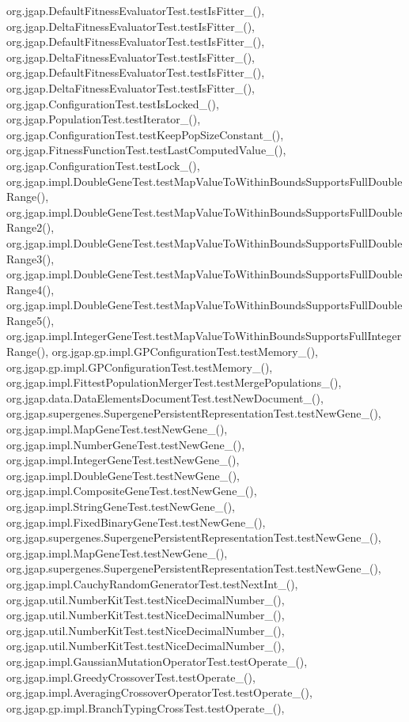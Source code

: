 org.\-jgap.\-Default\-Fitness\-Evaluator\-Test.\-test\-Is\-Fitter\-\_(), org.\-jgap.\-Delta\-Fitness\-Evaluator\-Test.\-test\-Is\-Fitter\-\_(), org.\-jgap.\-Default\-Fitness\-Evaluator\-Test.\-test\-Is\-Fitter\-\_(), org.\-jgap.\-Delta\-Fitness\-Evaluator\-Test.\-test\-Is\-Fitter\-\_(), org.\-jgap.\-Default\-Fitness\-Evaluator\-Test.\-test\-Is\-Fitter\-\_(), org.\-jgap.\-Delta\-Fitness\-Evaluator\-Test.\-test\-Is\-Fitter\-\_(), org.\-jgap.\-Configuration\-Test.\-test\-Is\-Locked\-\_(), org.\-jgap.\-Population\-Test.\-test\-Iterator\-\_(), org.\-jgap.\-Configuration\-Test.\-test\-Keep\-Pop\-Size\-Constant\-\_(), org.\-jgap.\-Fitness\-Function\-Test.\-test\-Last\-Computed\-Value\-\_(), org.\-jgap.\-Configuration\-Test.\-test\-Lock\-\_(), org.\-jgap.\-impl.\-Double\-Gene\-Test.\-test\-Map\-Value\-To\-Within\-Bounds\-Supports\-Full\-Double\-Range(), org.\-jgap.\-impl.\-Double\-Gene\-Test.\-test\-Map\-Value\-To\-Within\-Bounds\-Supports\-Full\-Double\-Range2(), org.\-jgap.\-impl.\-Double\-Gene\-Test.\-test\-Map\-Value\-To\-Within\-Bounds\-Supports\-Full\-Double\-Range3(), org.\-jgap.\-impl.\-Double\-Gene\-Test.\-test\-Map\-Value\-To\-Within\-Bounds\-Supports\-Full\-Double\-Range4(), org.\-jgap.\-impl.\-Double\-Gene\-Test.\-test\-Map\-Value\-To\-Within\-Bounds\-Supports\-Full\-Double\-Range5(), org.\-jgap.\-impl.\-Integer\-Gene\-Test.\-test\-Map\-Value\-To\-Within\-Bounds\-Supports\-Full\-Integer\-Range(), org.\-jgap.\-gp.\-impl.\-G\-P\-Configuration\-Test.\-test\-Memory\-\_(), org.\-jgap.\-gp.\-impl.\-G\-P\-Configuration\-Test.\-test\-Memory\-\_(), org.\-jgap.\-impl.\-Fittest\-Population\-Merger\-Test.\-test\-Merge\-Populations\-\_(), org.\-jgap.\-data.\-Data\-Elements\-Document\-Test.\-test\-New\-Document\-\_(), org.\-jgap.\-supergenes.\-Supergene\-Persistent\-Representation\-Test.\-test\-New\-Gene\-\_(), org.\-jgap.\-impl.\-Map\-Gene\-Test.\-test\-New\-Gene\-\_(), org.\-jgap.\-impl.\-Number\-Gene\-Test.\-test\-New\-Gene\-\_(), org.\-jgap.\-impl.\-Integer\-Gene\-Test.\-test\-New\-Gene\-\_(), org.\-jgap.\-impl.\-Double\-Gene\-Test.\-test\-New\-Gene\-\_(), org.\-jgap.\-impl.\-Composite\-Gene\-Test.\-test\-New\-Gene\-\_(), org.\-jgap.\-impl.\-String\-Gene\-Test.\-test\-New\-Gene\-\_(), org.\-jgap.\-impl.\-Fixed\-Binary\-Gene\-Test.\-test\-New\-Gene\-\_(), org.\-jgap.\-supergenes.\-Supergene\-Persistent\-Representation\-Test.\-test\-New\-Gene\-\_(), org.\-jgap.\-impl.\-Map\-Gene\-Test.\-test\-New\-Gene\-\_(), org.\-jgap.\-supergenes.\-Supergene\-Persistent\-Representation\-Test.\-test\-New\-Gene\-\_(), org.\-jgap.\-impl.\-Cauchy\-Random\-Generator\-Test.\-test\-Next\-Int\-\_(), org.\-jgap.\-util.\-Number\-Kit\-Test.\-test\-Nice\-Decimal\-Number\-\_(), org.\-jgap.\-util.\-Number\-Kit\-Test.\-test\-Nice\-Decimal\-Number\-\_(), org.\-jgap.\-util.\-Number\-Kit\-Test.\-test\-Nice\-Decimal\-Number\-\_(), org.\-jgap.\-util.\-Number\-Kit\-Test.\-test\-Nice\-Decimal\-Number\-\_(), org.\-jgap.\-impl.\-Gaussian\-Mutation\-Operator\-Test.\-test\-Operate\-\_(), org.\-jgap.\-impl.\-Greedy\-Crossover\-Test.\-test\-Operate\-\_(), org.\-jgap.\-impl.\-Averaging\-Crossover\-Operator\-Test.\-test\-Operate\-\_(), org.\-jgap.\-gp.\-impl.\-Branch\-Typing\-Cross\-Test.\-test\-Operate\-\_(), 